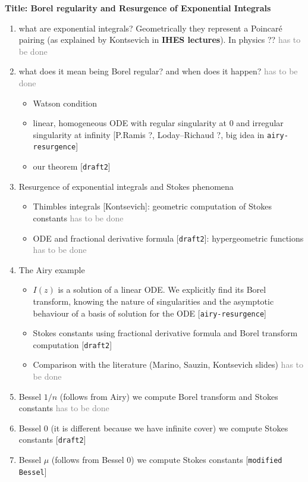 \documentclass{article}
\begin{document}
\textbf{Title: Borel regularity and Resurgence of Exponential Integrals}

\begin{enumerate}
\item what are exponential integrals? Geometrically they represent a Poincar\'e pairing (as explained by Kontsevich in \textbf{IHES lectures}). In physics ?? \textcolor{gray}{has to be done}
\item what does it mean being Borel regular? and when does it happen? \textcolor{gray}{has to be done}
\begin{itemize}
\item Watson condition
\item linear, homogeneous ODE with regular singularity at 0 and irregular singularity at infinity [P.Ramis ?, Loday--Richaud ?, big idea in {\tt airy-resurgence}]
\item our theorem [{\tt draft2}]
\end{itemize}
\item Resurgence of exponential integrals and Stokes phenomena
\begin{itemize}
\item Thimbles integrals [Kontsevich]: geometric computation of Stokes constants \textcolor{gray}{has to be done}
\item ODE and fractional derivative formula [{\tt draft2}]: hypergeometric functions \textcolor{gray}{has to be done}
\end{itemize}
\item The Airy example
\begin{itemize}
\item $I(z)$ is a solution of a linear ODE. We explicitly find its Borel transform, knowing the nature of singularities and the asymptotic behaviour of a basis of solution for the ODE  [{\tt airy-resurgence}]
\item Stokes constants using fractional derivative formula and Borel transform computation [{\tt draft2}]
\item Comparison with the literature (Marino, Sauzin, Kontsevich slides) \textcolor{gray}{has to be done}
\end{itemize}
\item Bessel $1/n$ (follows from Airy) we compute Borel transform and Stokes constants \textcolor{gray}{has to be done}
\item Bessel 0 (it is different because we have infinite cover) we compute Stokes constants [{\tt draft2}]
\item Bessel $\mu$ (follows from Bessel 0) we compute Stokes constants [{\tt modified Bessel}]
\end{enumerate}
\end{document}
